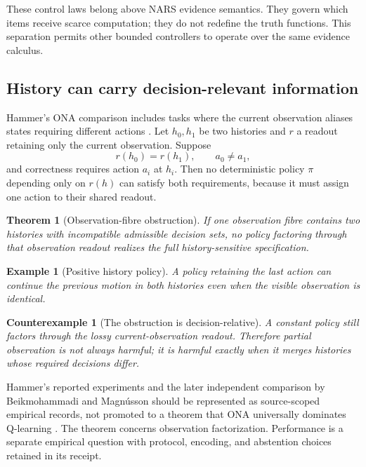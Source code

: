 \documentclass[11pt]{article}
\newtheorem{theorem}[definition]{Theorem}
\newtheorem{example}[definition]{Example}
\newtheorem{counterexample}[definition]{Counterexample}
\theoremstyle{remark}
\begin{document}
These control laws belong above NARS evidence semantics.  They govern which
items receive scarce computation; they do not redefine the truth functions.
This separation permits other bounded controllers to operate over the same
evidence calculus.

\subsection{History can carry decision-relevant information}

Hammer's ONA comparison includes tasks where the current observation aliases
states requiring different actions \cite{hammer2022}.  Let $h_0,h_1$ be two
histories and $r$ a readout retaining only the current observation.  Suppose
\[
  r(h_0)=r(h_1),\qquad a_0\neq a_1,
\]
and correctness requires action $a_i$ at $h_i$.  Then no deterministic policy
$\pi$ depending only on $r(h)$ can satisfy both requirements, because it must
assign one action to their shared readout.

\begin{theorem}[Observation-fibre obstruction]
If one observation fibre contains two histories with incompatible admissible
decision sets, no policy factoring through that observation readout realizes
the full history-sensitive specification.
\end{theorem}

\begin{example}[Positive history policy]
A policy retaining the last action can continue the previous motion in both
histories even when the visible observation is identical.
\end{example}

\begin{counterexample}[The obstruction is decision-relative]
A constant policy still factors through the lossy current-observation readout.
Therefore partial observation is not always harmful; it is harmful exactly
when it merges histories whose required decisions differ.
\end{counterexample}

Hammer's reported experiments and the later independent comparison by
Beikmohammadi and Magn\'usson should be represented as source-scoped empirical
records, not promoted to a theorem that ONA universally dominates Q-learning
\cite{hammer2022,beikmohammadi2023}.  The theorem concerns observation
factorization.  Performance is a separate empirical question with protocol,
encoding, and abstention choices retained in its receipt.
\end{document}
